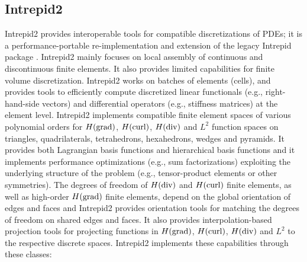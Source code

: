 \subsection{Intrepid2}
Intrepid2 provides interoperable tools for compatible discretizations of PDEs; it is a performance-portable re-implementation and extension of the legacy Intrepid package \cite{bochev2012}. Intrepid2 mainly focuses on local assembly of continuous and discontinuous finite elements. It also provides limited capabilities for finite volume discretization.  Intrepid2 works on batches of elements (cells), and provides tools to efficiently compute discretized linear functionals (e.g., right-hand-side vectors) and differential operators (e.g., stiffness matrices) at the element level. Intrepid2 implements compatible finite element spaces of various polynomial orders for $H({\rm grad})$, $H({\rm curl})$, $H({\rm div})$ and $L^2$ function spaces on triangles, quadrilaterals, tetrahedrons, hexahedrons, wedges and pyramids. It provides both Lagrangian basis functions and hierarchical basis functions \cite{fuentes2015} and it implements performance optimizations (e.g., sum factorizations) exploiting the underlying structure of the problem (e.g., tensor-product elements or other symmetries).  The degrees of freedom of $H({\rm div})$ and $H({\rm curl})$ finite elements, as well as high-order $H({\rm grad})$ finite elements, depend on the global orientation of edges and faces and Intrepid2 provides orientation tools for matching the degrees of freedom on shared edges and faces. It also provides interpolation-based projection tools for projecting functions in $H({\rm grad})$, $H({\rm curl})$, $H({\rm div})$ and $L^2$ to the respective discrete spaces. Intrepid2 implements these capabilities through these classes:
